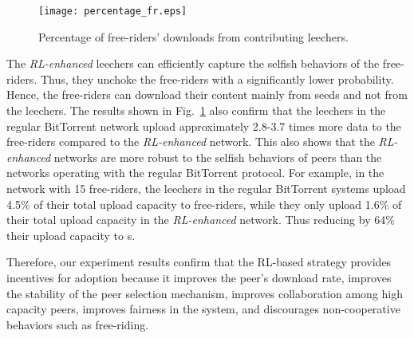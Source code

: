 \begin{figure}[t]
\centering
\texttt{[image: percentage\_fr.eps]}
\caption{Percentage of free-riders' downloads from contributing leechers.} 
\label{fig:upload_to_fr}
\end{figure}

The \emph{RL-enhanced} leechers can efficiently capture the selfish behaviors of 
the free-riders. Thus, they unchoke the free-riders with a significantly lower 
probability. Hence, the free-riders can download their content mainly from 
seeds and not from the leechers. The results shown in 
Fig.~\ref{fig:upload_to_fr} also confirm that the leechers in the regular 
BitTorrent network upload approximately 2.8-3.7 times more data to the 
free-riders compared to the \emph{RL-enhanced} network.
This also shows that the \emph{RL-enhanced} networks are more robust to the selfish 
behaviors of peers than the networks operating with the regular BitTorrent 
protocol. For example, in the network with 15 free-riders, the leechers in the 
regular BitTorrent systems upload 4.5\% of their total upload capacity to 
free-riders, while they only upload 1.6\% of their total upload capacity in the 
\emph{RL-enhanced} network. Thus reducing by 64\% their upload capacity to \FR s.

Therefore, our experiment results confirm that the RL-based strategy provides incentives for adoption because it improves the peer's download rate, improves 
the stability of the peer selection mechanism, improves collaboration among 
high capacity peers, improves fairness in the system, and discourages 
non-cooperative behaviors such as free-riding.





